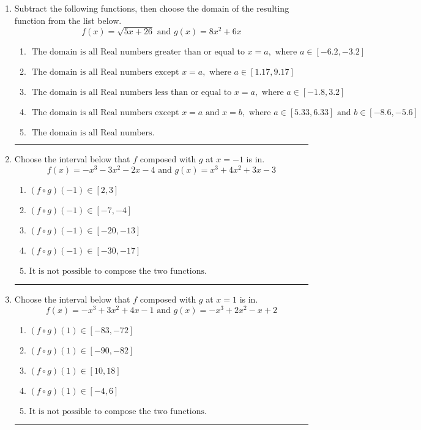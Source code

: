 \documentclass[14pt]{extbook}
\newcommand{\litem}[1]{\item#1\hspace*{-1cm}\rule{\textwidth}{0.4pt}}
\begin{document}
\begin{enumerate}
{\begin{enumerate}[label=\Alph*.]
\end{enumerate} }
\litem{
Subtract the following functions, then choose the domain of the resulting function from the list below.\[ f(x) = \sqrt{5x+26}  \text{ and } g(x) = 8x^{2} +6 x \]\begin{enumerate}[label=\Alph*.]
\item \( \text{ The domain is all Real numbers greater than or equal to } x = a, \text{ where } a \in [-6.2, -3.2] \)
\item \( \text{ The domain is all Real numbers except } x = a, \text{ where } a \in [1.17, 9.17] \)
\item \( \text{ The domain is all Real numbers less than or equal to } x = a, \text{ where } a \in [-1.8, 3.2] \)
\item \( \text{ The domain is all Real numbers except } x = a \text{ and } x = b, \text{ where } a \in [5.33, 6.33] \text{ and } b \in [-8.6, -5.6] \)
\item \( \text{ The domain is all Real numbers. } \)

\end{enumerate} }
\litem{
Choose the interval below that $f$ composed with $g$ at $x=-1$ is in.\[ f(x) = -x^{3} -3 x^{2} -2 x -4 \text{ and } g(x) = x^{3} +4 x^{2} +3 x -3 \]\begin{enumerate}[label=\Alph*.]
\item \( (f \circ g)(-1) \in [2, 3] \)
\item \( (f \circ g)(-1) \in [-7, -4] \)
\item \( (f \circ g)(-1) \in [-20, -13] \)
\item \( (f \circ g)(-1) \in [-30, -17] \)
\item \( \text{It is not possible to compose the two functions.} \)

\end{enumerate} }
\litem{
Choose the interval below that $f$ composed with $g$ at $x=1$ is in.\[ f(x) = -x^{3} +3 x^{2} +4 x -1 \text{ and } g(x) = -x^{3} +2 x^{2} -x + 2 \]\begin{enumerate}[label=\Alph*.]
\item \( (f \circ g)(1) \in [-83, -72] \)
\item \( (f \circ g)(1) \in [-90, -82] \)
\item \( (f \circ g)(1) \in [10, 18] \)
\item \( (f \circ g)(1) \in [-4, 6] \)
\item \( \text{It is not possible to compose the two functions.} \)

\end{enumerate} }
\end{enumerate}
\end{document}
